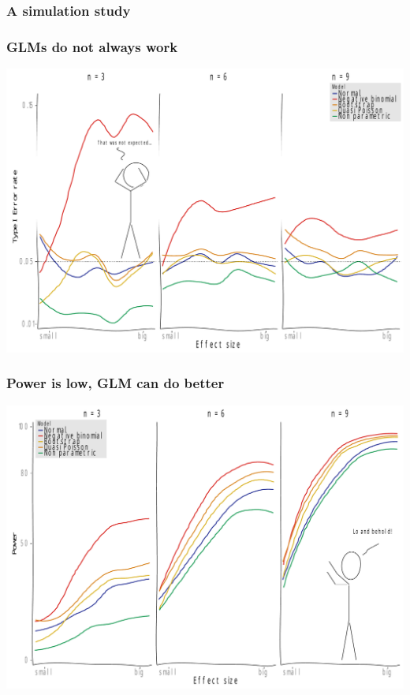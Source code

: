 \documentclass[10pt
	]{beamer}
\begin{document}
\begin{frame}
\frametitle{A simulation study}

\end{frame}



\begin{frame}
\frametitle{GLMs do not always work}
	\begin{center}
		\includegraphics[width=\textwidth]{figs/p_t1_xkcd.pdf}
	\end{center}
\end{frame}


\begin{frame}
\frametitle{Power is low, GLM can do better}
	\begin{center}
	\includegraphics[width = \textwidth]{figs/p_pow_xkcd.pdf}
	\end{center}
\end{frame}
\end{document}
